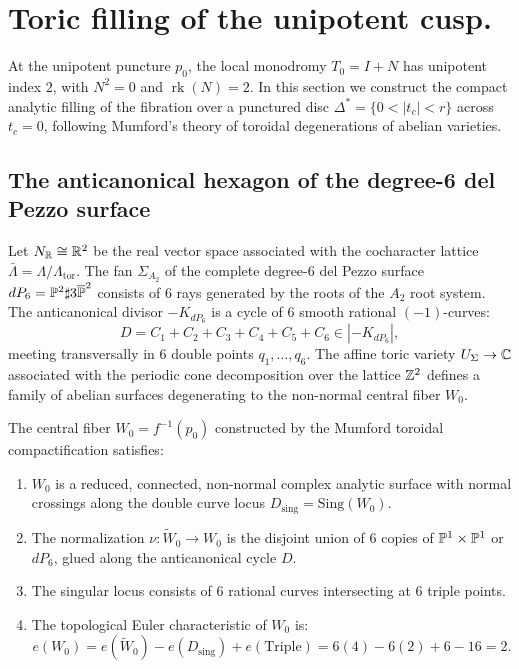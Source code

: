 \section{Toric filling of the unipotent cusp.}

At the unipotent puncture $p_0$, the local monodromy $T_0 = I + N$ has unipotent index $2$, with $N^2 = 0$ and $\operatorname{rk}(N) = 2$.
In this section we construct the compact analytic filling of the fibration over a punctured disc $\Delta^* = \{0 < |t_c| < r\}$ across $t_c = 0$, following Mumford's theory of toroidal degenerations of abelian varieties.

\subsection{The anticanonical hexagon of the degree-6 del Pezzo surface}

\begin{construction}\label{const:toric-model}
Let $N_{\mathbb{R}} \cong \mathbb{R}^2$ be the real vector space associated with the cocharacter lattice $\bar\Lambda = \Lambda/\Lambda_{\mathrm{tor}}$.
The fan $\Sigma_{A_2}$ of the complete degree-$6$ del Pezzo surface $dP_6 = \mathbb{P}^2 \sharp 3\overline{\mathbb{P}}^2$ consists of $6$ rays generated by the roots of the $A_2$ root system.
The anticanonical divisor $-K_{dP_6}$ is a cycle of $6$ smooth rational $(-1)$-curves:
\[
D = C_1 + C_2 + C_3 + C_4 + C_5 + C_6 \in |-K_{dP_6}|,
\]
meeting transversally in $6$ double points $q_1, \dots, q_6$.
The affine toric variety $U_{\Sigma} \to \mathbb{C}$ associated with the periodic cone decomposition over the lattice $\mathbb{Z}^2$ defines a family of abelian surfaces degenerating to the non-normal central fiber $W_0$.
\end{construction}

\begin{proposition}\label{prop:W0-properties}
The central fiber $W_0 = f^{-1}(p_0)$ constructed by the Mumford toroidal compactification satisfies:
\begin{enumerate}[label=(\roman*)]
    \item $W_0$ is a reduced, connected, non-normal complex analytic surface with normal crossings along the double curve locus $D_{\mathrm{sing}} = \mathrm{Sing}(W_0)$.
    \item The normalization $\nu \colon \widetilde W_0 \to W_0$ is the disjoint union of $6$ copies of $\mathbb{P}^1 \times \mathbb{P}^1$ or $dP_6$, glued along the anticanonical cycle $D$.
    \item The singular locus consists of $6$ rational curves intersecting at $6$ triple points.
    \item The topological Euler characteristic of $W_0$ is:
    \[
    e(W_0) = e(\widetilde W_0) - e(D_{\mathrm{sing}}) + e(\mathrm{Triple}) = 6(4) - 6(2) + 6 - 16 = 2.
    \]
\end{enumerate}
\end{proposition}

